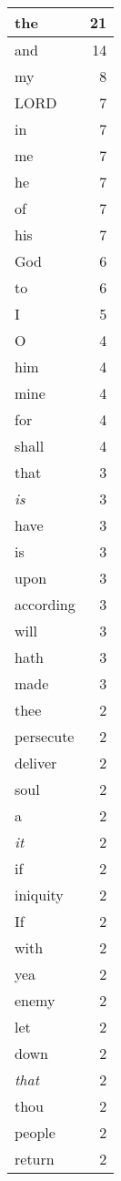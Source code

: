 \begin{center}
\begin{longtable}{l|r}
\hline \hline
\endlastfoot
the & 21 \\ \hline
and & 14 \\ \hline
my & 8 \\ \hline
LORD & 7 \\ \hline
in & 7 \\ \hline
me & 7 \\ \hline
he & 7 \\ \hline
of & 7 \\ \hline
his & 7 \\ \hline
God & 6 \\ \hline
to & 6 \\ \hline
I & 5 \\ \hline
O & 4 \\ \hline
him & 4 \\ \hline
mine & 4 \\ \hline
for & 4 \\ \hline
shall & 4 \\ \hline
that & 3 \\ \hline
\emph{is} & 3 \\ \hline
have & 3 \\ \hline
is & 3 \\ \hline
upon & 3 \\ \hline
according & 3 \\ \hline
will & 3 \\ \hline
hath & 3 \\ \hline
made & 3 \\ \hline
thee & 2 \\ \hline
persecute & 2 \\ \hline
deliver & 2 \\ \hline
soul & 2 \\ \hline
a & 2 \\ \hline
\emph{it} & 2 \\ \hline
if & 2 \\ \hline
iniquity & 2 \\ \hline
If & 2 \\ \hline
with & 2 \\ \hline
yea & 2 \\ \hline
enemy & 2 \\ \hline
let & 2 \\ \hline
down & 2 \\ \hline
\emph{that} & 2 \\ \hline
thou & 2 \\ \hline
people & 2 \\ \hline
return & 2 \\ \hline

\end{longtable}
\end{center}

